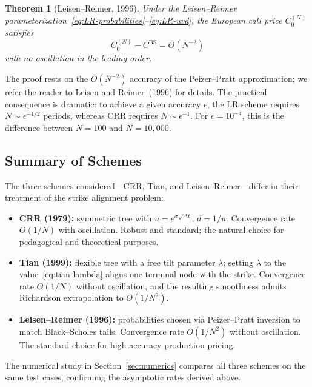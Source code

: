 \documentclass[11pt,a4paper]{article}
\theoremstyle{plain}
\newtheorem{theorem}{Theorem}[section]
\theoremstyle{definition}
\begin{document}
\begin{theorem}[Leisen--Reimer, 1996]
\label{thm:LR-convergence}
Under the Leisen--Reimer parameterization~\eqref{eq:LR-probabilities}--\eqref{eq:LR-uvd},
the European call price $C_0^{(N)}$ satisfies
\begin{equation}
    \label{eq:LR-rate}
    C_0^{(N)} - C^{\mathrm{BS}} = O(N^{-2})
\end{equation}
with no oscillation in the leading order.
\end{theorem}

The proof rests on the $O(N^{-2})$ accuracy of the Peizer--Pratt
approximation; we refer the reader to Leisen and Reimer~(1996) for
details. The practical consequence is dramatic: to achieve a given
accuracy $\epsilon$, the LR scheme requires $N \sim \epsilon^{-1/2}$
periods, whereas CRR requires $N \sim \epsilon^{-1}$. For
$\epsilon = 10^{-4}$, this is the difference between $N = 100$ and
$N = 10{,}000$.

\subsection{Summary of Schemes}
\label{subsec:schemes-summary}

The three schemes considered---CRR, Tian, and Leisen--Reimer---differ in
their treatment of the strike alignment problem:

\begin{itemize}
    \item \textbf{CRR (1979):} symmetric tree with $u = e^{\sigma\sqrt{\Delta t}}$,
    $d = 1/u$. Convergence rate $O(1/N)$ with oscillation. Robust and
    standard; the natural choice for pedagogical and theoretical purposes.

    \item \textbf{Tian (1999):} flexible tree with a free tilt parameter
    $\lambda$; setting $\lambda$ to the value~\eqref{eq:tian-lambda}
    aligns one terminal node with the strike. Convergence rate $O(1/N)$
    without oscillation, and the resulting smoothness admits Richardson
    extrapolation to $O(1/N^2)$.

    \item \textbf{Leisen--Reimer (1996):} probabilities chosen via
    Peizer--Pratt inversion to match Black--Scholes tails. Convergence
    rate $O(1/N^2)$ without oscillation. The standard choice for
    high-accuracy production pricing.
\end{itemize}

The numerical study in Section~\ref{sec:numerics} compares all three
schemes on the same test cases, confirming the asymptotic rates derived
above.
\end{document}
